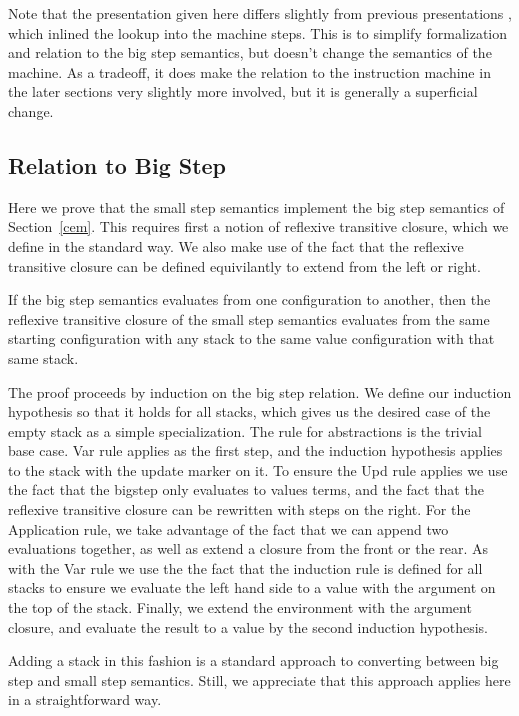 Note that the presentation given here differs slightly from previous
presentations \cite{cem}, which inlined the lookup into the machine steps. This
is to simplify formalization and relation to the big step semantics, but doesn't
change the semantics of the machine. As a tradeoff, it does make the relation to
the instruction machine in the later sections very slightly more involved, but
it is generally a superficial change.

\subsection{Relation to Big Step}
Here we prove that the small step semantics implement the big step semantics of
Section~\ref{cem}. This requires first a notion of reflexive transitive closure,
which we define in the standard way. We also make use of the fact that the
reflexive transitive closure can be defined equivilantly to extend from the left
or right. 

\begin{lemma}
If the big step semantics evaluates from one configuration to another, then the
reflexive transitive closure of the small step semantics evaluates from the same
starting configuration with any stack to the same value configuration with that
same stack.
\end{lemma}
\begin{proofoutline}
The proof proceeds by induction on the big step relation. We define our
induction hypothesis so that it holds for all stacks, which gives us the
desired case of the empty stack as a simple specialization. The rule for
abstractions is the trivial base case. Var rule applies as the first step, and
the induction hypothesis applies to the stack with the update marker on it. To
ensure the Upd rule applies we use the fact that the bigstep only evaluates to
values terms, and the fact that the reflexive transitive closure can be
rewritten with steps on the right. For the Application rule, we take advantage
of the fact that we can append two evaluations together, as well as extend a
closure from the front or the rear. As with the Var rule we use the the fact
that the induction rule is defined for all stacks to ensure we evaluate the left
hand side to a value with the argument on the top of the stack.  Finally, we
extend the environment with the argument closure, and evaluate the result to a
value by the second induction hypothesis.   
\end{proofoutline}

Adding a stack in this fashion is a standard approach to converting between big
step and small step semantics. Still, we appreciate that this approach applies
here in a straightforward way. 

